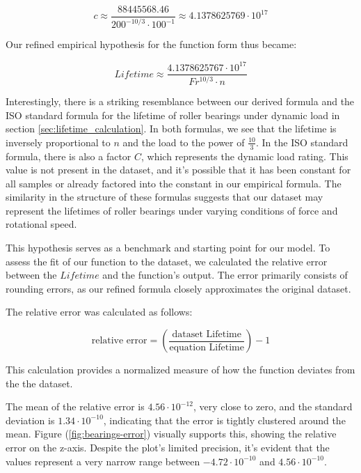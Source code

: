\begin{equation}
\label{eq:constant_c}
c \approx \frac{88445568.46}{200^{-10/3} \cdot 100^{-1}} \approx 4.1378625769 \cdot 10^{17}
\end{equation}

Our refined empirical hypothesis for the function form thus became:

\begin{equation}
\label{eq:refined_hypothesis}
Lifetime \approx \frac{4.1378625767 \cdot 10^{17}}{Fr^{10/3} \cdot n}
\end{equation}

Interestingly, there is a striking resemblance between our derived formula and the ISO standard formula for the lifetime of roller bearings under dynamic load in section \ref{sec:lifetime_calculation}. In both formulas, we see that the lifetime is inversely proportional to \(n\) and the load to the power of \(\frac{10}{3}\). In the ISO standard formula, there is also a factor \(C\), which represents the dynamic load rating. This value is not present in the dataset, and it's possible that it has been constant for all samples or already factored into the constant in our empirical formula. The similarity in the structure of these formulas suggests that our dataset may represent the lifetimes of roller bearings under varying conditions of force and rotational speed.

This hypothesis serves as a benchmark and starting point for our model. To assess the fit of our function to the dataset, we calculated the relative error between the \(Lifetime\) and the function's output. The error primarily consists of rounding errors, as our refined formula closely approximates the original dataset.

The relative error was calculated as follows:

\begin{equation}
\text{relative error} = \left(\frac{\text{dataset Lifetime}}{\text{equation Lifetime}}\right) - 1
\end{equation}

This calculation provides a normalized measure of how the function deviates from the the dataset.

The mean of the relative error is \(4.56 \cdot 10^{-12}\), very close to zero, and the standard deviation is \(1.34 \cdot 10^{-10}\), indicating that the error is tightly clustered around the mean. Figure (\ref{fig:bearings-error}) visually supports this, showing the relative error on the z-axis. Despite the plot's limited precision, it's evident that the values represent a very narrow range between \(-4.72 \cdot 10^{-10}\) and \(4.56 \cdot 10^{-10}\).

